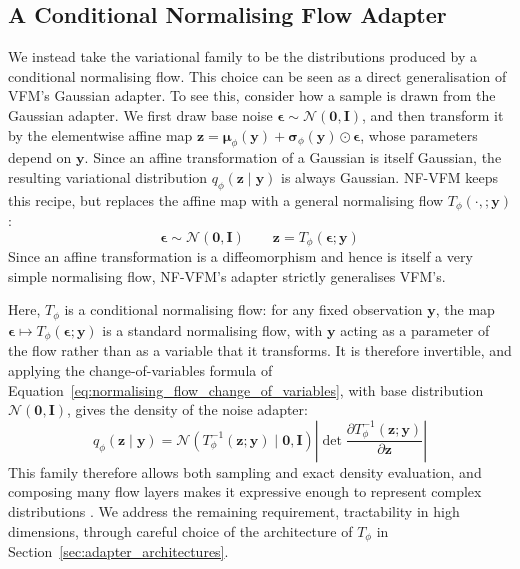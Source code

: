 \documentclass[12pt,a4paper]{report}
\begin{document}
\subsection{A Conditional Normalising Flow Adapter}
\label{subsec:conditional_nf_adapter}
We instead take the variational family to be the distributions produced by a conditional normalising flow. This choice can be seen as a direct generalisation of VFM's Gaussian adapter. To see this, consider how a sample is drawn from the Gaussian adapter. We first draw base noise $\boldsymbol{\epsilon}\sim\mathcal{N}(\mathbf{0},\mathbf{I})$, and then transform it by the elementwise affine map $\mathbf{z}=\boldsymbol{\mu}_{\phi}(\mathbf{y})+\boldsymbol{\sigma}_{\phi}(\mathbf{y})\odot\boldsymbol{\epsilon}$, whose parameters depend on $\mathbf{y}$. Since an affine transformation of a Gaussian is itself Gaussian, the resulting variational distribution $q_\phi(\mathbf{z} \mid \mathbf{y})$ is always Gaussian. NF-VFM keeps this recipe, but replaces the affine map with a general normalising flow $T_{\phi}(\cdot,;\mathbf{y})$:
\begin{equation}
\boldsymbol{\epsilon}\sim\mathcal{N}(\mathbf{0},\mathbf{I})
\qquad
\mathbf{z}=T_{\phi}(\boldsymbol{\epsilon};\mathbf{y})
\label{eq:nf_adapter}
\end{equation}
Since an affine transformation is a diffeomorphism and hence is itself a very simple normalising flow, NF-VFM's adapter strictly generalises VFM's. 

Here, $T_{\phi}$ is a conditional normalising flow: for any fixed observation $\mathbf{y}$, the map $\boldsymbol{\epsilon}\mapsto T_{\phi}(\boldsymbol{\epsilon};\mathbf{y})$ is a standard normalising flow, with $\mathbf{y}$ acting as a parameter of the flow rather than as a variable that it transforms. It is therefore invertible, and applying the change-of-variables formula of Equation~\ref{eq:normalising_flow_change_of_variables}, with base distribution $\mathcal{N}(\mathbf{0},\mathbf{I})$, gives the density of the noise adapter:
\begin{equation}
q_{\phi}(\mathbf{z}\mid\mathbf{y})
=
\mathcal{N}\left(T_{\phi}^{-1}(\mathbf{z};\mathbf{y})\mid\mathbf{0},\mathbf{I}\right)
\left|
\det
\frac{\partial T_{\phi}^{-1}(\mathbf{z};\mathbf{y})}{\partial\mathbf{z}}
\right|
\label{eq:nf_adapter_density}
\end{equation}
This family therefore allows both sampling and exact density evaluation, and composing many flow layers makes it expressive enough to represent complex distributions \parencite{NF_survey}. We address the remaining requirement, tractability in high dimensions, through careful choice of the architecture of $T_{\phi}$ in Section~\ref{sec:adapter_architectures}.
\end{document}
